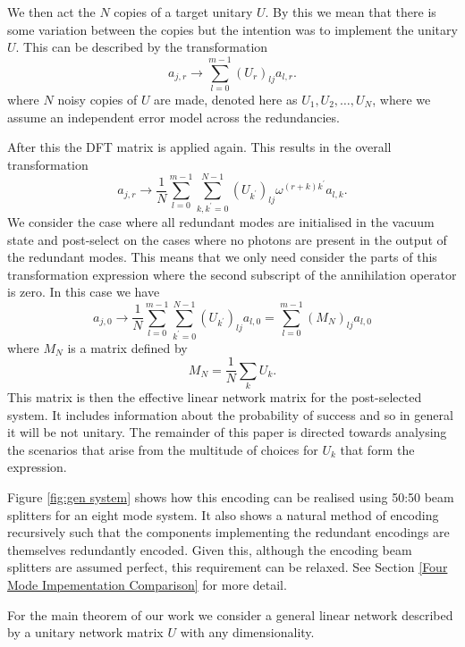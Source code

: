 \documentclass[aps,pra,twocolumn,superscriptaddress,numerical,floatfix]{revtex4-1}
\begin{document}
We then act the $N$ copies of a target unitary $U$.  By this we mean that there is some variation between the copies but the intention was to implement the unitary $U$.  This can be described by the transformation
\begin{equation}
	a_{j,r} \rightarrow \sum_{l=0}^{m-1} (U_r)_{lj} a_{l,r}.
\end{equation}
where $N$ noisy copies of $U$ are made, denoted here as $U_1, U_2, \ldots, U_N$, where we assume an independent error model across the redundancies. 

After this the DFT matrix is applied again.  This results in the overall transformation
\begin{equation}
	a_{j,r} \rightarrow \frac{1}{N} 
	\sum_{l=0}^{m-1} \sum_{k,k^\prime=0}^{N-1}
	(U_{k^\prime})_{lj} \omega^{(r+k)k^\prime} a_{l,k}.
\end{equation}
We consider the case where all redundant modes are initialised in the vacuum state and post-select on the cases where no photons are present in the output of the redundant modes.  This means that we only need consider the parts of this transformation expression where the second subscript of the annihilation operator is zero.  In this case we have
\begin{equation}
	\label{sum_transformation}
	a_{j,0} \rightarrow \frac{1}{N}\sum_{l=0}^{m-1} \sum_{k^\prime=0}^{N-1}
	(U_{k^\prime})_{lj} a_{l,0} = \sum_{l=0}^{m-1} (M_N)_{lj} a_{l,0}
\end{equation}
where $M_N$ is a matrix defined by
\begin{equation}
	M_N = \frac{1}{N} \sum_k U_k.
\end{equation}
This matrix is then the effective linear network matrix for the post-selected system.  It includes information about the probability of success and so in general it will be not unitary.  The remainder of this paper is directed towards analysing the scenarios that arise from the multitude of choices for $U_k$ that form the expression.

Figure \ref{fig:gen system} shows how this encoding can be realised using 50:50 beam splitters for an eight mode system. It also shows a natural method of encoding recursively such that the components implementing the redundant encodings are themselves redundantly encoded. Given this, although the encoding beam splitters are assumed perfect, this requirement can be relaxed. See Section \ref{Four Mode Impementation Comparison} for more detail.

For the main theorem of our work we consider a general linear network described by a unitary network matrix $U$ with any dimensionality. 
\end{document}
